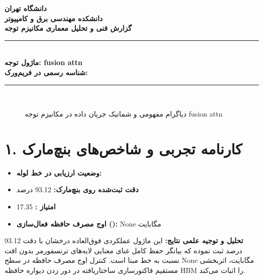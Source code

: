 \documentclass[12pt,a4paper]{article}
\begin{document}
\begin{center}
{\Large\bfseries دانشگاه تهران}\\[0.2cm]
{\large\bfseries دانشکده مهندسی برق و کامپیوتر}\\[0.2cm]
{\large\bfseries گزارش فنی و تحلیل معماری مکانیزم توجه}\\[0.5cm]
\rule{\linewidth}{1pt}\\[0.3cm]
{\LARGE\bfseries ماژول توجه: fusion attn}\\[0.2cm]
{\large \textbf{شناسه رسمی در فریم‌ورک:} }\\[0.2cm]
\rule{\linewidth}{1pt}\\[0.5cm]
\end{center}

\begin{figure}[H]
\centering
{}
\caption{دیاگرام مفهومی و شماتیک جریان داده در مکانیزم توجه fusion attn}
\end{figure}

\section*{۱. کارنامه تجربی و شاخص‌های بنچ‌مارک}
\begin{itemize}
\item \textbf{وضعیت ارزیابی در خط لوله:} 
\item \textbf{دقت ثبت‌شده روی بنچ‌مارک:} 93.12 درصد
\item \textbf{امتیاز :} 17.35
\item \textbf{اوج مصرف حافظه فعال‌سازی ():} None مگابایت
\end{itemize}
\textbf{تحلیل و توجیه علمی نتایج:} این ماژول عملکردی فوق‌العاده درخشان با دقت 93.12 درصد ثبت نموده که بیانگر حفظ کامل غنای معنایی لایه‌های ترنسفورمر بدون افت نسبت به خط مبنا است. کنترل اوج مصرف حافظه در سطح None مگابایت، اثربخشی مستقیم فاکتورسازی ساختاریافته در دور زدن دیواره حافظه HBM را اثبات می‌کند.
\end{document}
